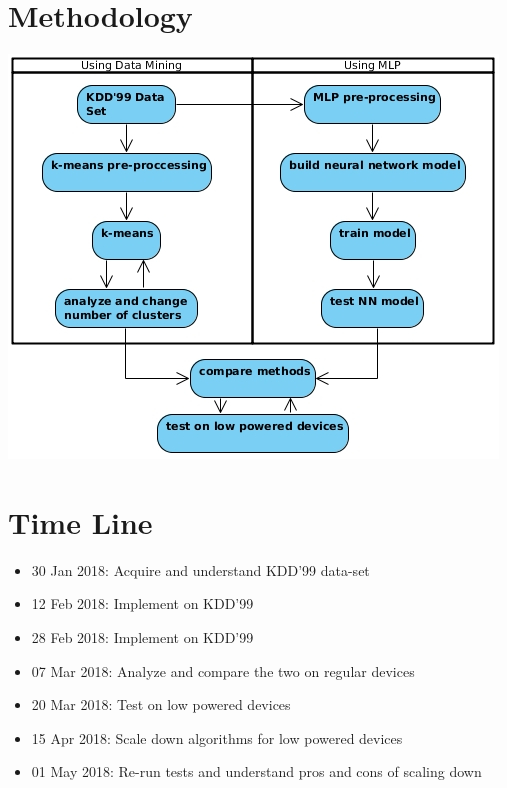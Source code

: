 \documentclass[a4paper,12pt]{article}
\begin{document}
	\section{Methodology}
	\includegraphics{methodology}

	\section{Time Line}
	\begin{itemize}
		\item 30 Jan 2018: Acquire and understand KDD'99 data-set
		\item 12 Feb 2018: Implement \cite{dm15} on KDD'99
		\item 28 Feb 2018: Implement \cite{mlp17} on KDD'99
		\item 07 Mar 2018: Analyze and compare the two on regular devices
		\item 20 Mar 2018: Test on low powered devices
		\item 15 Apr 2018: Scale down algorithms for low powered devices
		\item 01 May 2018: Re-run tests and understand pros and cons of scaling down
	\end{itemize}

	
	
	
\end{document}
